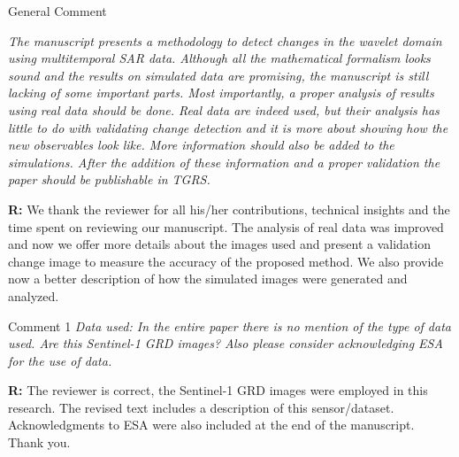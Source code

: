 \documentclass[11pt]{report}
\begin{document}
\begin{mybox}{General Comment}

\textit{The manuscript presents a methodology to detect changes in the wavelet domain using multitemporal SAR
data. Although all the mathematical formalism looks sound and the results on simulated data are promising,
the manuscript is still lacking of some important parts. Most importantly, a proper analysis of results using
real data should be done. Real data are indeed used, but their analysis has little to do with validating change
detection and it is more about showing how the new observables look like. More information should also be
added to the simulations. After the addition of these information and a proper validation the paper should be
publishable in TGRS.}
\medskip

\textbf{R:} We thank the reviewer for all his/her contributions, technical insights and the time
spent on reviewing our manuscript. The analysis of real data was improved and now we offer more details about the images used and present a validation change image to measure the accuracy of the proposed method. We also provide now a better description of how the simulated images were generated and analyzed.
\end{mybox}

\medskip
\begin{mybox}{Comment 1}
\textit{Data used: In the entire paper there is no mention of the type of data used. Are this Sentinel-1 GRD images? Also please consider acknowledging ESA for the use of data.}


\medskip
\textbf{R:} The reviewer is correct, the Sentinel-1 GRD images were employed in this research. The revised text includes a description of this sensor/dataset. Acknowledgments to ESA were also included at the end of the manuscript. Thank you.
\end{mybox}
\end{document}
